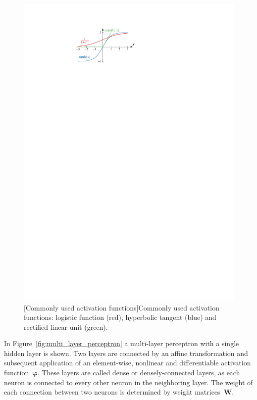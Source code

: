 \begin{figure}[htb]
\begin{minipage}[t]{0.4\textwidth}
    \includegraphics{./figures/theory/activation_functions.pdf}
    [Commonly used activation functions]{Commonly used activation
      functions: logistic function (red), hyperbolic tangent (blue) and
      rectified linear unit (green).}
    \label{fig:activation_functions}
  \end{minipage}
\end{figure}
In Figure~\ref{fig:multi_layer_perceptron} a multi-layer perceptron with a
single hidden layer is shown. Two layers are connected by an affine
transformation and subsequent application of an element-wise, nonlinear and
differentiable activation function~$\bm{\varphi}$. These layers are called dense
or densely-connected layers, as each neuron is connected to every other neuron
in the neighboring layer. The weight of each connection between two neurons is
determined by weight matrices~$\mathbf{W}$.
